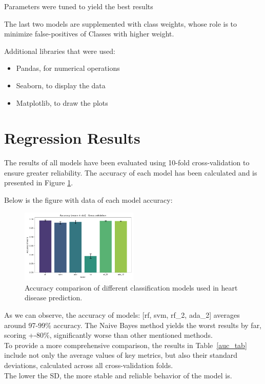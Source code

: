 \documentclass[conference]{IEEEtran}
\begin{document}
Parameters were tuned to yield the best results %

The last two models are supplemented with class weights, whose role is to minimize false-positives of Classes with higher weight.

Additional libraries that were used:
\begin{itemize}
    \item Pandas, for numerical operations
    \item Seaborn, to display the data
    \item Matplotlib, to draw the plots
\end{itemize}

\section{Regression Results}

The results of all models have been evaluated using 10-fold cross-validation to ensure greater reliability.
The accuracy of each model has been calculated and is presented in Figure \ref{fig:accuracy}. 


Below is the figure with data of each model accuracy:
\begin{figure}[H]%
    \centering
    \includegraphics[width=0.5\textwidth]{../src/plots/accuracy_cv_plot.png}
    \caption{Accuracy comparison of different classification models used in heart disease prediction.}
    \label{fig:accuracy}
\end{figure}

As we can observe, the accuracy of models: [rf, svm, rf\_2, ada\_2] averages around 97-99\% accuracy.
The Naive Bayes method yields the worst results by far, scoring +-80\%, significantly worse than other
mentioned methods.
\\ 

To provide a more comprehensive comparison, the results in Table~\ref{auc_tab} include not only the average values of key metrics,  
but also their standard deviations, calculated across all cross-validation folds. \\
The lower the SD, the more stable and reliable behavior of the model is.
\end{document}
